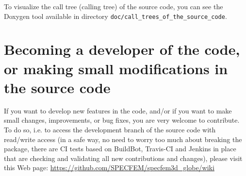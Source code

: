 To visualize the call tree (calling tree) of the source code, you can see the Doxygen tool available in directory \texttt{doc/call\_trees\_of\_the\_source\_code}.

\section{Becoming a developer of the code, or making small modifications in the source code}

If you want to develop new features in the code, and/or if you want to make small changes, improvements, or bug fixes, you are very welcome to contribute. To do so, i.e. to access the development branch of the source code with read/write access (in a safe way, no need to worry too much about breaking the package, there are CI tests based on BuildBot, Travis-CI and Jenkins in place that are checking and validating all new contributions and changes), please visit this Web page:\newline
\url{https://github.com/SPECFEM/specfem3d_globe/wiki}

